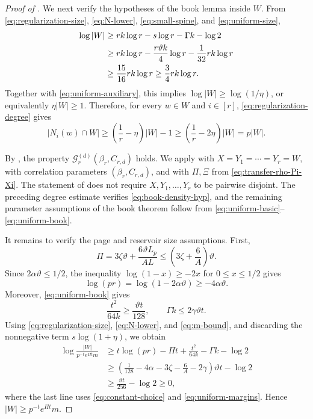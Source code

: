 \documentclass[twoside,12pt]{article}
\theoremstyle{definition}
\theoremstyle{remark}
\newcommand{\1}{\mathbf 1}
\begin{document}
\begin{proof}[Proof of ]
We next verify the hypotheses of the book lemma inside $W$. From
\eqref{eq:regularization-size}, \eqref{eq:N-lower},
\eqref{eq:small-spine}, and \eqref{eq:uniform-size},
\begin{align}
 \log|W|
 &\ge rk\log r-s\log r-\Gamma k-\log2\notag\\
 &\ge rk\log r-\frac{r\vartheta k}{4}\log r
       -\frac1{32}rk\log r\notag\\
 &\ge\frac{15}{16}rk\log r
 \ge\frac34rk\log r.
 \label{eq:W-crude}
\end{align}
Together with \eqref{eq:uniform-auxiliary}, this implies
$\log|W|\ge\log(1/\eta)$, or equivalently $\eta|W|\ge1$. Therefore, for
every $w\in W$ and $i\in[r]$, \eqref{eq:regularization-degree} gives
\[
 |N_i(w)\cap W|
 \ge\left(\frac1r-\eta\right)|W|-1
 \ge\left(\frac1r-2\eta\right)|W|
 =p|W|.
\]

By , the property
$\mathcal G_r^{(d)}(\beta_r,C_{r,d})$ holds. We apply  with
$
 X=Y_1=\cdots=Y_r=W,
$
with correlation parameters $(\beta_r,C_{r,d})$, and with $\Pi,\Xi$ from
\eqref{eq:transfer-rho-Pi-Xi}. The statement of  does not
require $X,Y_1,\ldots,Y_r$ to be pairwise disjoint. The preceding degree
estimate verifies \eqref{eq:book-density-hyp}, and the remaining parameter
assumptions of the book theorem follow from
\eqref{eq:uniform-basic}--\eqref{eq:uniform-book}.

It remains to verify the page and reservoir size assumptions. First,
\[
 \Pi
 =3\zeta\vartheta+\frac{6\vartheta L_p}{AL}
 \le\left(3\zeta+\frac6A\right)\vartheta.
\]
Since $2\alpha\vartheta\le1/2$, the inequality
$\log(1-x)\ge-2x$ for $0\le x\le1/2$ gives
\[
 \log(pr)=\log(1-2\alpha\vartheta)
 \ge-4\alpha\vartheta.
\]
Moreover, \eqref{eq:uniform-book} gives
\[
 \frac{t^2}{64k}\ge\frac{\vartheta t}{128},
 \qquad
 \Gamma k\le2\gamma\vartheta t.
\]
Using \eqref{eq:regularization-size}, \eqref{eq:N-lower}, and
\eqref{eq:m-bound}, and discarding the nonnegative term
$s\log(1+\eta)$, we obtain
\begin{align*}
 \log\frac{|W|}{p^{-t}e^{\Pi t}m}
 &\ge t\log(pr)-\Pi t+\frac{t^2}{64k}
       -\Gamma k-\log2\\
 &\ge\left(
 \frac1{128}-4\alpha-3\zeta-\frac6A-2\gamma
 \right)\vartheta t-\log2\\
 &\ge\frac{\vartheta t}{256}-\log2
 \ge0,
\end{align*}
where the last line uses \eqref{eq:constant-choice} and
\eqref{eq:uniform-margins}. Hence
$
 |W|\ge p^{-t}e^{\Pi t}m.
$


\end{proof}
\end{document}
